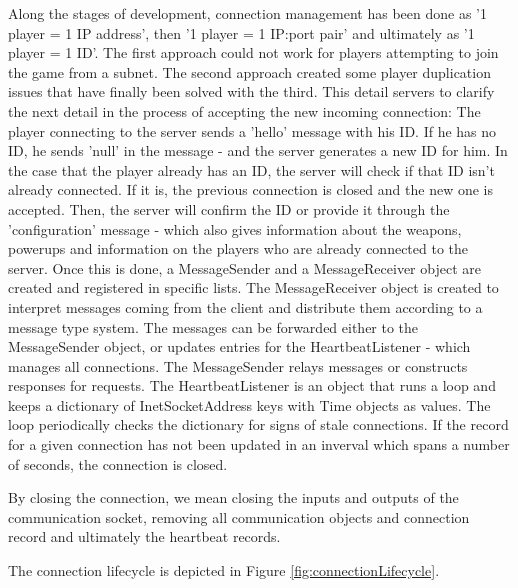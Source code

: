 Along the stages of development, connection management has been done as '1
player = 1 IP address', then '1 player = 1 IP:port pair' and ultimately as '1
player = 1 ID'. The first approach could not work for players attempting to join
the game from a subnet. The second approach created some player duplication
issues that have finally been solved with the third. This detail servers to
clarify the next detail in the process of accepting the new incoming connection:
The player connecting to the server sends a 'hello' message with his ID. If he
has no ID, he sends 'null' in the message - and the server generates a new ID
for him. In the case that the player already has an ID, the server will check if
that ID isn't already connected. If it is, the previous connection is closed and
the new one is accepted. Then, the server will confirm the ID or provide it
through the 'configuration' message - which also gives information about the
weapons, powerups and information on the players who are already connected to
the server. Once this is done, a MessageSender and a MessageReceiver object are
created and registered in specific lists. The MessageReceiver object is created
to interpret messages coming from the client and distribute them according to a
message type system. The messages can be forwarded either to the MessageSender
object, or updates entries for the HeartbeatListener - which manages all
connections. The MessageSender relays messages or constructs responses for
requests. The HeartbeatListener is an object that runs a loop and keeps a
dictionary of InetSocketAddress keys with Time objects as values. The loop
periodically checks the dictionary for signs of stale connections. If the record
for a given connection has not been updated in an inverval which spans a number
of seconds, the connection is closed.\newline

By closing the connection, we mean closing the inputs and outputs of the
communication socket, removing all communication objects and connection
record and ultimately the heartbeat records.\newline

The connection lifecycle is depicted in Figure \ref{fig:connectionLifecycle}.

